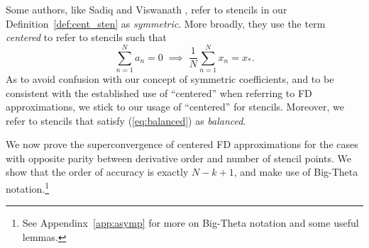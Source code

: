 \documentclass[12pt]{article}
\newcommand{\xstar}{x_*}
\begin{document}
%
\begin{remark}\label{rm:balanced}
Some authors, like Sadiq and Viswanath \cite{sadiq2014}, refer to stencils in our Definition~\ref{def:cent_sten} as \textit{symmetric}.
More broadly, they use the term \textit{centered} to refer to stencils such that
\begin{equation}\label{eq:balanced}
	\sum _{n=1}^{N} a_n=0 \; \implies \; \frac{1}{N}\sum_{n=1}^N x_n = \xstar.
\end{equation}
As to avoid confusion with our concept of symmetric coefficients, and to be consistent with the established use of  ``centered'' when referring to FD approximations, we stick to our usage of ``centered'' for stencils.
Moreover, we refer to stencils that satisfy (\ref{eq:balanced}) as \textit{balanced}.
\end{remark}

We now prove the superconvergence of centered FD approximations for the cases with opposite parity between derivative order and  number of stencil points.
We show that the order of accuracy is exactly $N-k+1$, and make use of Big-Theta notation.\footnote{See Appendinx~\ref{app:asymp} for more on Big-Theta notation and some useful lemmas.}
\end{document}
